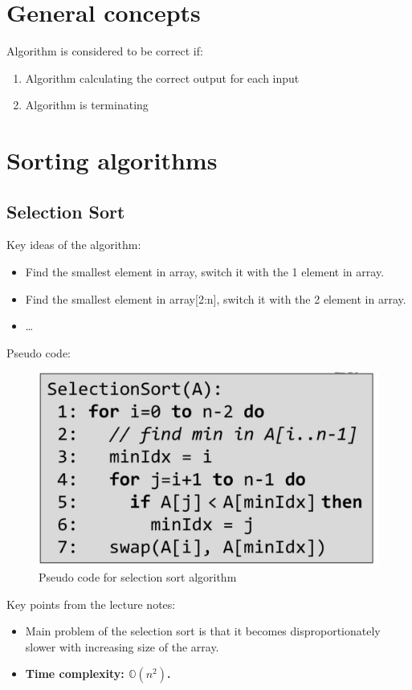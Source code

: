 \documentclass[a4paper,
  twoside, %
  headlines=2.1 %
  ]{scrartcl}
\author{\yourname}
\title{\lecture}
\date{} %
\begin{document}
\section*{General concepts}

Algorithm is considered to be correct if:

\begin{enumerate}
    \item Algorithm calculating the correct output for each input
    \item Algorithm is terminating
\end{enumerate}

\section*{Sorting algorithms}

    \subsection*{Selection Sort}

    Key ideas of the algorithm: 
    \begin{itemize}
        \item Find the smallest element in array, switch it with the 1 element in array.
        \item Find the smallest element in array[2:n], switch it with the 2 element in array.
        \item \dots{}
    \end{itemize}
    Pseudo code:
    \begin{figure}[H]
        \centering
        \includegraphics[width=0.3\linewidth]{image.png}
        \caption{Pseudo code for selection sort algorithm}
        \label{fig:enter-label}
    \end{figure}
    Key points from the lecture notes:
    \begin{itemize}
       \item  Main problem of the selection sort is that it becomes disproportionately slower with increasing size of the array.
       \item \textbf{Time complexity: $\mathbb{O}(n^{2})$.}
    \end{itemize}
\end{document}
